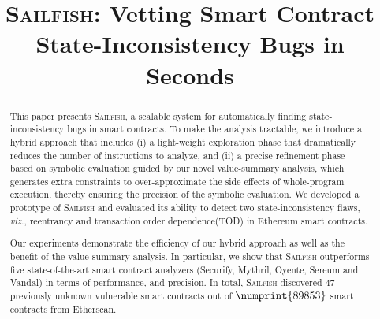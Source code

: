 \documentclass[conference, romanappendices]{tex/IEEEtran}
\theoremstyle{bfnote}
\newcommand{\toolname}{\textsc{Sailfish}\xspace}
\newcommand{\oyente}{{\sc Oyente}\xspace}
\newcommand{\securify}{{\sc Securify}\xspace}
\newcommand{\sereum}{{\sc Sereum}\xspace}
\newcommand{\vandal}{{\sc Vandal}\xspace}
\newcommand{\smart}{smart contract}
\newcommand{\ethereum}{Ethereum}
\newcommand{\etherscan}{{\sc Etherscan}\xspace}
\newcommand{\reentrancy}{{reentrancy}\xspace}
\newcommand{\tod}{{transaction order dependence}\xspace}
\newcommand{\si}{{state-inconsistency}\xspace}
\newcommand{\vsa}{{value-summary analysis}\xspace}
\newcommand{\mythril}{{\sc Mythril}\xspace}
\newcommand{\viz}{\textit{viz.}}
\let\num\numprint
\newcommand{\dataset}{89853}
\newcommand{\zeroDays}{47}
\begin{document}
	\title{\toolname: Vetting Smart Contract State-Inconsistency Bugs in Seconds}
	\author{
	
	}

	 \maketitle
	\begin{abstract}
This paper presents \toolname, a scalable system for automatically finding state-inconsistency bugs in smart contracts.
To make the analysis tractable, we introduce a hybrid approach that includes (i) a light-weight exploration phase that dramatically reduces the number of instructions to analyze, and (ii) a precise refinement phase based on symbolic evaluation guided by our novel \vsa, which generates extra constraints to over-approximate the side effects of whole-program execution, thereby ensuring the precision of the symbolic evaluation.
We developed a prototype of \toolname and evaluated its ability to detect two \si flaws, \viz, \reentrancy and \tod (TOD) in \ethereum{} \smart s.

Our experiments demonstrate the efficiency of our hybrid approach as well as the benefit of the value summary analysis.
In particular, we show that \toolname outperforms five state-of-the-art \smart{} analyzers (\securify, \mythril, \oyente, \sereum and \vandal) in terms of performance, and precision.
In total, \toolname discovered $\zeroDays$ previously unknown vulnerable smart contracts out of  $\num{\dataset}$ \smart s from \etherscan.
\end{abstract}
\end{document}
